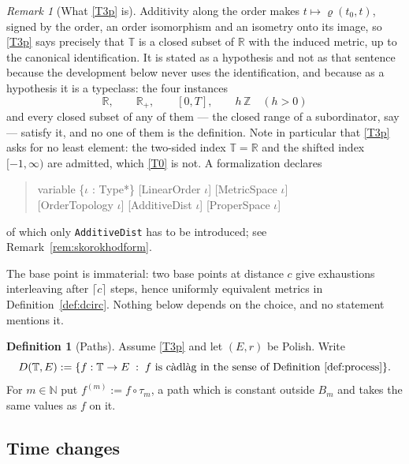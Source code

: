 \documentclass[11pt,a4paper]{article}
\theoremstyle{plain}
\theoremstyle{definition}
\newtheorem{definition}[theorem]{Definition}
\theoremstyle{remark}
\newtheorem{remark}[theorem]{Remark}
\newcommand{\R}{\mathbb{R}}
\newcommand{\N}{\mathbb{N}}
\newcommand{\Rp}{\R_+}
\newcommand{\T}{\mathbb{T}}                     %
\newcommand{\DT}{D(\T,E)}
\begin{document}
\begin{remark}[What \eqref{T3p} is]
  \label{rem:T3primeis}
  Additivity along the order makes $t \mapsto \varrho(t_0,t)$, signed by the order,
  an order isomorphism and an isometry onto its image, so \eqref{T3p} says
  precisely that $\T$ is a closed subset of $\R$ with the induced metric, up to
  the canonical identification.  It is stated as a hypothesis and not as that
  sentence because the development below never uses the identification, and
  because as a hypothesis it is a typeclass: the four instances
  \[
    \R, \qquad \Rp, \qquad [0,T], \qquad h\,\mathbb{Z} \quad (h > 0)
  \]
  and every closed subset of any of them --- the closed range of a subordinator,
  say --- satisfy it, and no one of them is the definition.  Note in particular
  that \eqref{T3p} asks for no least element: the two-sided index $\T = \R$ and
  the shifted index $[-1,\infty)$ are admitted, which \eqref{T0} is not.  A
  formalization declares
  \begin{quote}\ttfamily\small
    variable \{$\iota$ : Type*\} [LinearOrder $\iota$] [MetricSpace $\iota$]\\
    \phantom{variable }[OrderTopology $\iota$] [AdditiveDist $\iota$] [ProperSpace $\iota$]
  \end{quote}
  of which only \texttt{AdditiveDist} has to be introduced; see
  Remark~\ref{rem:skorokhodform}.

  The base point is immaterial: two base points at distance $c$ give exhaustions
  interleaving after $\lceil c \rceil$ steps, hence uniformly equivalent metrics
  in Definition~\ref{def:dcirc}.  Nothing below depends on the choice, and no
  statement mentions it.
\end{remark}

\begin{definition}[Paths]
  \label{def:skorokhod}
  Assume \eqref{T3p} and let $(E,r)$ be Polish.  Write
  \[
    \DT := \{ f : \T \to E \;:\; f \text{ is c\`adl\`ag in the sense of
      Definition~\ref{def:process}} \}.
  \]
  For $m \in \N$ put $f^{(m)} := f \circ \tau_m$, a path which is constant
  outside $B_m$ and takes the same values as $f$ on it.
\end{definition}

\subsection{Time changes}
\label{ssec:timechange}
\end{document}
